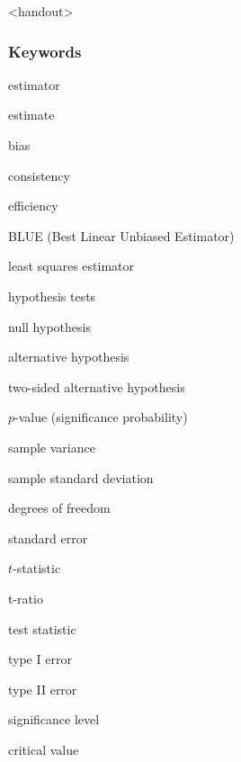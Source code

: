 

\begin{frame}<handout>
\frametitle{Keywords}
\begin{iteminline}
\item estimator
\item estimate
\item bias
\item consistency
\item efficiency
\item BLUE (Best Linear Unbiased Estimator)
\item least squares estimator
\item hypothesis tests
\item null hypothesis
\item alternative hypothesis
\item two-sided alternative hypothesis
\item $p$-value (significance probability)
\item sample variance
\item sample standard deviation
\item degrees of freedom
\item standard error
\item $t$-statistic
\item t-ratio
\item test statistic
\item type I error
\item type II error
\item significance level
\item critical value
\end{iteminline}
\end{frame}


